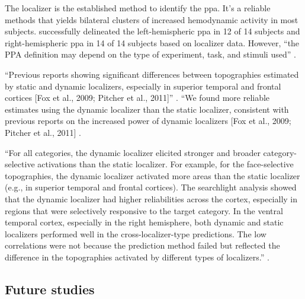 
%
The localizer is the established method to identify the \ac{ppa}.
It's a reliable methods that yields bilateral clusters of increased hemodynamic
activity in most subjects.
%
\citet{sengupta2016extension} successfully delineated the left-hemispheric
\ac{ppa} in 12 of 14 subjects and right-hemispheric \ac{ppa} in 14 of 14
subjects based on localizer data.
%
However, ``the PPA definition may depend on the type of experiment, task, and
stimuli used'' \citep{weiner2018defining}.



``Previous reports showing significant differences between topographies
estimated by static and dynamic localizers, especially in superior temporal and
frontal cortices [Fox et al., 2009; Pitcher et al., 2011]''
\citep{jiahui2022cross}.
%
``We found more reliable estimates using the dynamic localizer than the static
localizer, consistent with previous reports on the increased power of dynamic
localizers [Fox et al., 2009; Pitcher et al., 2011]
\citep{jiahui2020predicting}.

%
``For all categories, the dynamic localizer elicited stronger and broader
category-selective activations than the static localizer.
%
For example, for the face-selective topographies, the dynamic localizer
activated more areas than the static localizer (e.g., in superior temporal and
frontal cortices).
%
The searchlight analysis showed that the dynamic localizer had higher
reliabilities across the cortex, especially in regions that were selectively
responsive to the target category.
%
In the ventral temporal cortex, especially in the right hemisphere, both dynamic
and static localizers performed well in the cross-localizer-type predictions.
%
The low correlations were not because the prediction method failed but reflected
the difference in the topographies activated by different types of localizers.''
\citep{jiahui2022cross}.



\subsection{Future studies}



